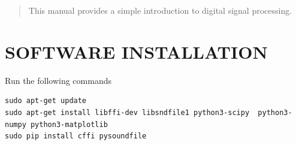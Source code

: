 \documentclass[journal,12pt,twocolumn]{IEEEtran}
\theoremstyle{remark}
\begin{document}


\vspace{3cm}

\title{}
\author{EE23BTECH11024 -  G.Karthik Yadav \par Audio Filtering
}
\maketitle

\tableofcontents

\bigskip

\begin{abstract}
This manual provides a simple introduction to digital signal processing.
\end{abstract}


\section{SOFTWARE INSTALLATION}
\bigskip

Run the following commands
\begin{lstlisting}
sudo apt-get update
sudo apt-get install libffi-dev libsndfile1 python3-scipy  python3-numpy python3-matplotlib 
sudo pip install cffi pysoundfile 
\end{lstlisting}
\end{document}
